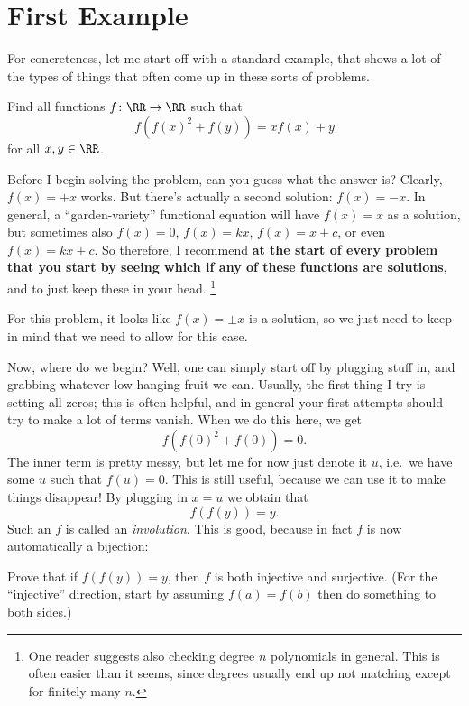 \documentclass[11pt]{scrartcl}
\begin{document}
\section{First Example}
For concreteness, let me start off with a standard example,
that shows a lot of the types of things that often come up in these sorts of problems.
\begin{example}[Kyrgyzstan 2012]
  \label{ex:begin}
  Find all functions $f \colon \RR \to \RR$ such that
  \[ f(f(x)^2+f(y)) = xf(x)+y \]
  for all $x,y \in \RR$.
\end{example}

\begin{soln}
  Before I begin solving the problem, can you guess what the answer is?
  Clearly, $f(x) = +x$ works.
  But there's actually a second solution: $f(x) = -x$.
  In general, a ``garden-variety'' functional equation will have $f(x) = x$ as a solution,
  but sometimes also $f(x) = 0$, $f(x) = kx$, $f(x) = x+c$, or even $f(x) = kx+c$.
  So therefore, I recommend \textbf{at the start of every problem that you start by seeing
  which if any of these functions are solutions},
  and to just keep these in your head.%
  \footnote{One reader suggests also
    checking degree $n$ polynomials in general.
    This is often easier than it seems,
    since degrees usually end up not
    matching except for finitely many $n$.}

  For this problem,
  it looks like $f(x) = \pm x$ is a solution, so we just need
  to keep in mind that we need to allow for this case.

  Now, where do we begin?
  Well, one can simply start off by plugging stuff in,
  and grabbing whatever low-hanging fruit we can.
  Usually, the first thing I try is setting all zeros; this is often helpful,
  and in general your first attempts should try to make a lot of terms vanish.
  When we do this here, we get
  \[ f(f(0)^2 + f(0)) = 0. \]
  The inner term is pretty messy, but let me for now just denote it $u$,
  i.e.\ we have some $u$ such that $f(u) = 0$.
  This is still useful, because we can use it to make things disappear!
  By plugging in $x=u$ we obtain that
  \[ f(f(y)) = y. \]
  Such an $f$ is called an \emph{involution}.
  This is good, because in fact $f$ is now automatically a bijection:
  \begin{exercise}
    Prove that if $f(f(y)) = y$, then $f$ is both injective and surjective.
    (For the ``injective'' direction, start by assuming $f(a) = f(b)$
    then do something to both sides.)
  \end{exercise}


\end{soln}
\end{document}
